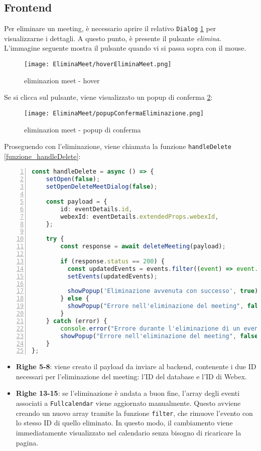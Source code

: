 \subsection{Frontend}
Per eliminare un meeting, è necessario aprire il relativo \texttt{Dialog} \ref{eliminazion_meet_hover} per visualizzarne i dettagli. 
A questo punto, è presente il pulsante \textit{elimina}. 
L'immagine seguente mostra il pulsante quando vi si passa sopra con il mouse.
\begin{figure}[H]
    \centering
    \texttt{[image: EliminaMeet/hoverEliminaMeet.png]}
    \caption{eliminazion meet - hover}
    \label{eliminazion_meet_hover}
\end{figure}
\noindent Se si clicca sul pulsante, viene visualizzato un popup di conferma \ref{eliminazion_meet_popup_di_conferma}:
\begin{figure}[H]
    \centering
    \texttt{[image: EliminaMeet/popupConfermaEliminazione.png]}
    \caption{eliminazion meet - popup di conferma}
    \label{eliminazion_meet_popup_di_conferma}
\end{figure}
\noindent Proseguendo con l'eliminazione, viene chiamata la funzione \texttt{handleDelete} \ref{funzione_handleDelete}:
\begin{lstlisting}[language=typescript, frame=lines, basicstyle=\ttfamily\scriptsize, numbers=left, 
    caption={funzione handleDelete}, label={funzione_handleDelete}]
const handleDelete = async () => {
    setOpen(false);
    setOpenDeleteMeetDialog(false);
  
    const payload = {
        id: eventDetails.id,
        webexId: eventDetails.extendedProps.webexId,
    };
  
    try {
        const response = await deleteMeeting(payload);
  
        if (response.status == 200) {
          const updatedEvents = events.filter((event) => event.id != eventDetails.id);
          setEvents(updatedEvents);
  
          showPopup('Eliminazione avvenuta con successo', true);
        } else {
          showPopup("Errore nell'eliminazione del meeting", false);
        }
    } catch (error) {
        console.error("Errore durante l'eliminazione di un evento:", error);
        showPopup("Errore nell'eliminazione del meeting", false);
    }
};
\end{lstlisting}
\begin{itemize}
    \item \textbf{Righe 5-8}:  viene creato il payload da inviare al backend, 
    contenente i due ID necessari per l'eliminazione del meeting: l'ID del database e l'ID di Webex.

    \item \textbf{Righe 13-15}: se l'eliminazione è andata a buon fine, l'array degli eventi associati a \texttt{Fullcalendar} 
    viene aggiornato manualmente. Questo avviene creando un nuovo array tramite la funzione \texttt{filter}, 
    che rimuove l'evento con lo stesso ID di quello eliminato. In questo modo, il cambiamento viene immediatamente visualizzato
    nel calendario senza bisogno di ricaricare la pagina.
\end{itemize}

